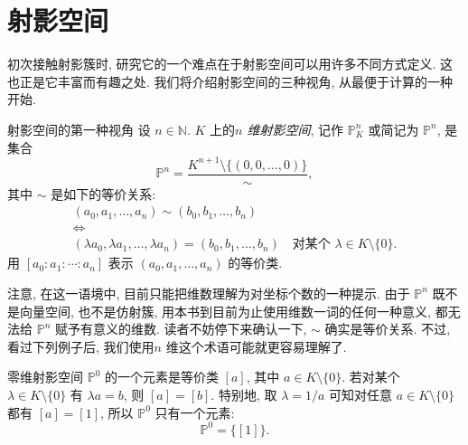 \section{射影空间}\label{sec:projective-space}

初次接触射影簇时, 研究它的一个难点在于射影空间可以用许多不同方式定义. 这也正是它丰富而有趣之处. 我们将介绍射影空间的三种视角, 从最便于计算的一种开始.

\begin{Definition}{射影空间的第一种视角}\leavevmode\label{def:projective-space-homogeneous-coordinates}
设 $n\in\mathbb{N}$. $K$ 上的\emph{$n$ 维射影空间}, 记作 $\mathbb{P}_{K}^{n}$ 或简记为 $\mathbb{P}^{n}$, 是集合
\[
  \mathbb{P}^{n}=\frac{K^{n+1}\setminus\{(0,0,\ldots,0)\}}{\sim},
\]
其中 $\sim$ 是如下的等价关系:
\[
  \begin{gathered}
    (a_{0},a_{1},\ldots,a_{n})\sim(b_{0},b_{1},\ldots,b_{n})\\
    \Longleftrightarrow\\
    (\lambda a_{0},\lambda a_{1},\ldots,\lambda a_{n})=(b_{0},b_{1},\ldots,b_{n})
      \quad\text{对某个 }\lambda\in K\setminus\{0\}.
  \end{gathered}
\]
用 $[a_{0}:a_{1}:\cdots:a_{n}]$ 表示 $(a_{0},a_{1},\ldots,a_{n})$ 的等价类.
\end{Definition}

\BookPairedNoteLeft
  {注意, 在这一语境中, 目前只能把\textquotedbl{}维数\textquotedbl{}理解为对坐标个数的一种提示. 由于 $\mathbb{P}^{n}$ 既不是向量空间, 也不是仿射簇, 用本书到目前为止使用\textquotedbl{}维数\textquotedbl{}一词的任何一种意义, 都无法给 $\mathbb{P}^{n}$ 赋予有意义的维数.}
  {读者不妨停下来确认一下, $\sim$ 确实是等价关系.}
不过, 看过下列例子后, 我们使用\textquotedbl{}$n$ 维\textquotedbl{}这个术语可能就更容易理解了.

\begin{Example}{零维射影空间}\leavevmode\label{ex:zero-dimensional-projective-space}
$\mathbb{P}^{0}$ 的一个元素是等价类 $[a]$, 其中 $a\in K\setminus\{0\}$. 若对某个 $\lambda\in K\setminus\{0\}$ 有 $\lambda a=b$, 则 $[a]=[b]$. 特别地, 取 $\lambda=1/a$ 可知对任意 $a\in K\setminus\{0\}$ 都有 $[a]=[1]$, 所以 $\mathbb{P}^{0}$ 只有一个元素:
\[
  \mathbb{P}^{0}=\{[1]\}.
\]
\end{Example}

